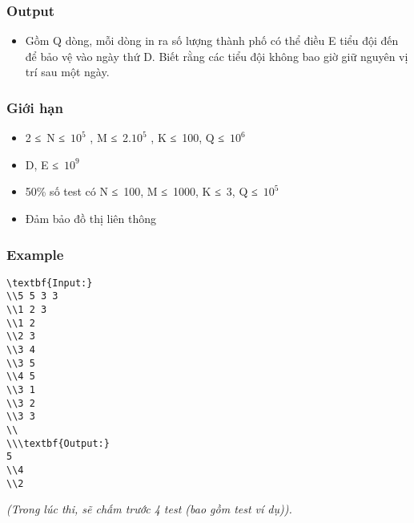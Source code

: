 \subsubsection{   Output  }
\begin{itemize}
	\item     Gồm Q dòng, mỗi dòng in ra số lượng thành phố có thể điều E tiểu đội đến để bảo vệ vào ngày thứ D. Biết rằng các tiểu đội không bao giờ giữ nguyên vị trí sau một ngày.   
\end{itemize}

\subsubsection{   Giới hạn  }
\begin{itemize}
	\item     2 ≤ N ≤ $10^{5}$    , M ≤ 2.$10^{5}$    , K ≤ 100, Q ≤ $10^{6}$
	\item     D, E ≤ $10^{9}$
	\item     50\% số test có N ≤ 100, M ≤ 1000, K ≤ 3, Q ≤ $10^{5}$
	\item     Đảm bảo đồ thị liên thông   
\end{itemize}

\subsubsection{   Example  }
\begin{verbatim}
\textbf{Input:}
\\5 5 3 3
\\1 2 3
\\1 2
\\2 3
\\3 4
\\3 5
\\4 5
\\3 1
\\3 2
\\3 3
\\
\\\textbf{Output:}
5
\\4
\\2\end{verbatim}

\emph{    (Trong lúc thi, sẽ chấm trước 4 test (bao gồm test ví dụ)).   }
